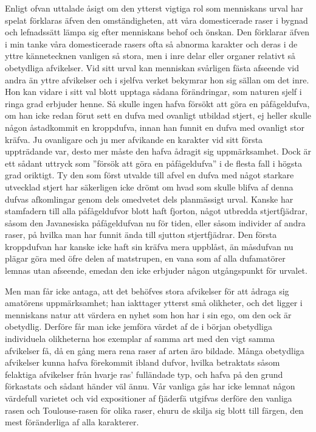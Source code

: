 Enligt ofvan uttalade åsigt om den ytterst vigtiga rol som menniskans urval har spelat förklaras äfven den omständigheten, att våra domesticerade raser i bygnad och lefnadssätt lämpa sig efter menniskans behof och önskan. Den förklarar äfven i min tanke våra domesticerade rasers ofta så abnorma karakter och deras i de yttre kännetecknen vanligen så stora, men i inre delar eller organer relativt så obetydliga afvikelser. Vid sitt urval kan menniskan svårligen fästa afseende vid andra än yttre afvikelser och i sjelfva verket bekymrar hon sig sällan om det inre. Hon kan vidare i sitt val blott upptaga sådana förändringar, som naturen sjelf i ringa grad erbjuder henne. Så skulle ingen hafva försökt att göra en påfågeldufva, om han icke redan förut sett en dufva med ovanligt utbildad stjert, ej heller skulle någon åstadkommit en kroppdufva, innan han funnit en dufva med ovanligt stor kräfva. Ju ovanligare och ju mer afvikande en karakter vid sitt första uppträdande var, desto mer måste den hafva ådragit sig uppmärksamhet. Dock är ett sådant uttryck som ”försök att göra en påfågeldufva” i de flesta fall i högsta grad oriktigt. Ty den som först utvalde till afvel en dufva med något starkare utvecklad stjert har säkerligen icke drömt om hvad som skulle blifva af denna dufvas afkomlingar genom dels omedvetet dels planmässigt urval. Kanske har stamfadern till alla påfågeldufvor blott haft fjorton, något utbredda stjertfjädrar, såsom den Javanesiska påfågeldufvan nu för tiden, eller såsom individer af andra raser, på hvilka man har funnit ända till sjutton stjertfjädrar. Den första kroppdufvan har kanske icke haft sin kräfva mera uppblåst, än måsdufvan nu plägar göra med öfre delen af matstrupen, en vana som af alla dufamatörer lemnas utan afseende, emedan den icke erbjuder någon utgångspunkt för urvalet.

Men man får icke antaga, att det behöfves stora afvikelser för att ådraga sig amatörens uppmärksamhet; han iakttager ytterst små olikheter, och det ligger i menniskans natur att värdera en nyhet som hon har i sin ego, om den ock är obetydlig. Derföre får man icke jemföra värdet af de i början obetydliga individuela olikheterna hos exemplar af samma art med den vigt samma afvikelser få, då en gång mera rena raser af arten äro bildade. Många obetydliga afvikelser kunna hafva förekommit ibland dufvor, hvilka betraktats såsom felaktiga afvikelser från hvarje ras’ fulländade typ, och hafva på den grund förkastats och sådant händer väl ännu. Vår vanliga gås har icke lemnat någon värdefull varietet och vid expositioner af fjäderfä utgifvas derföre den vanliga rasen och Toulouse-rasen för olika raser, ehuru de skilja sig blott till färgen, den mest föränderliga af alla karakterer.

